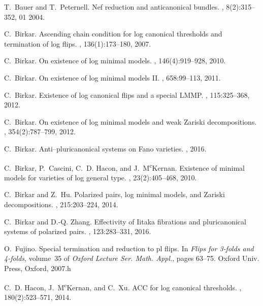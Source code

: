 \documentclass[11pt]{amsart}
\begin{document}

\begin{thebibliography}{10}
	
	T.~Bauer and T.~Peternell.
	\newblock Nef reduction and anticanonical bundles.
	, 8(2):315--352, 01 2004.
	
	C.~Birkar.
	\newblock Ascending chain condition for log canonical thresholds and
	termination of log flips.
	, 136(1):173--180, 2007.
	
	C.~Birkar.
	\newblock On existence of log minimal models.
	, 146(4):919--928, 2010.
	
	C.~Birkar.
	\newblock On existence of log minimal models {II}.
	, 658:99--113, 2011.
	
	C.~Birkar.
	\newblock Existence of log canonical flips and a special {LMMP}.
	, 115:325--368, 2012.
	
	C.~Birkar.
	\newblock On existence of log minimal models and weak {Z}ariski decompositions.
	, 354(2):787--799, 2012.
	
	C.~Birkar.
	\newblock Anti--pluricanonical systems on {F}ano varieties.
	, 2016.
	
	C.~Birkar, P.~Cascini, C.~D. Hacon, and J.~M\textsuperscript{c}Kernan.
	\newblock Existence of minimal models for varieties of log general type.
	, 23(2):405--468, 2010.
	
	C.~Birkar and Z.~Hu.
	\newblock Polarized pairs, log minimal models, and {Z}ariski decompositions.
	, 215:203--224, 2014.
	
	C.~Birkar and D.-Q. Zhang.
	\newblock Effectivity of {I}itaka fibrations and pluricanonical systems of
	polarized pairs.
	, 123:283--331, 2016.
	
	O.~Fujino.
	\newblock Special termination and reduction to pl flips.
	\newblock In {\em Flips for 3-folds and 4-folds}, volume~35 of {\em Oxford
		Lecture Ser. Math. Appl.}, pages 63--75. Oxford Univ. Press, Oxford, 2007.h
	
	C.~D. Hacon, J.~M\textsuperscript{c}Kernan, and C.~Xu.
	\newblock A{CC} for log canonical thresholds.
	, 180(2):523--571, 2014.
	

\end{thebibliography}
\end{document}
